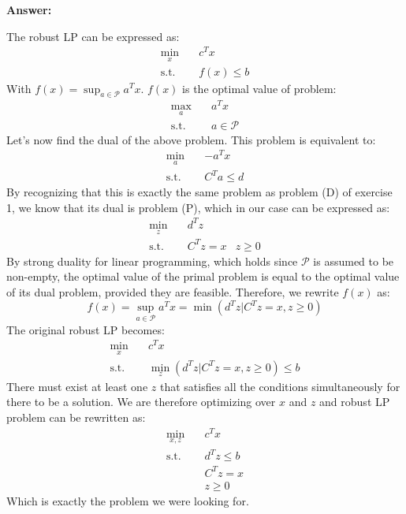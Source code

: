 \documentclass[11pt,a4paper]{article}
\newenvironment{solution}{
  \par\noindent\textbf{Answer:}\vspace{0.3em}
}{\vspace{1em}}
\begin{document}
\begin{solution}
    The robust LP can be expressed as: $$\begin{aligned}
        \min_x \quad & c^T x\\
        \text{s.t.} \quad & f(x) \leq b
    \end{aligned}$$
    With $f(x) = \sup_{a \in \mathcal{P}} a^T x$. $f(x)$ is the optimal value of problem: $$\begin{aligned}
        \max_a \quad & a^T x\\
        \text{s.t.} \quad & a \in \mathcal{P}
    \end{aligned}$$
    Let's now find the dual of the above problem. This problem is equivalent to: $$\begin{aligned}
        \min_a \quad & -a^T x\\
        \text{s.t.} \quad & C^T a \leq d
    \end{aligned}$$
    By recognizing that this is exactly the same problem as problem (D) of exercise 1, we know that its dual is problem (P), which in our case can be expressed as: $$\begin{aligned}
        \min_z \quad & d^T z\\
        \text{s.t.} \quad & C^T z = x
        & z \geq 0
    \end{aligned}$$
    By strong duality for linear programming, which holds since $\mathcal{P}$ is assumed to be non-empty, the optimal value of the primal problem is equal to the optimal value of its dual problem, provided they are feasible. Therefore, we rewrite $f(x)$ as: $$f(x) = \sup_{a \in \mathcal{P}} a^T x = \min (d^T z | C^T z = x, z \geq 0)$$
    The original robust LP becomes: $$\begin{aligned}
        \min_x \quad & c^T x\\
        \text{s.t.} \quad & \min_z (d^T z | C^T z = x, z \geq 0) \leq b
    \end{aligned}$$
    There must exist at least one $z$ that satisfies all the conditions simultaneously for there to be a solution. We are therefore optimizing over $x$ and $z$ and robust LP problem can be rewritten as: $$\begin{aligned}
        \min_{x,z} \quad & c^{T}x \\
        \text{s.t.} \quad & d^{T}z \leq b \\
        & C^{T}z = x \\
        & z \ge 0
    \end{aligned}$$
    Which is exactly the problem we were looking for.
\end{solution}
\end{document}

